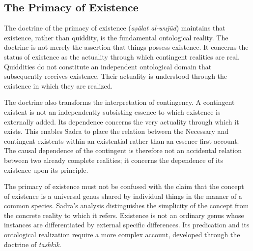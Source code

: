


\subsection{The Primacy of Existence}
\label{subsec:ch08_s17_ss05}

\label{para:VS.B01.P01.C08.S17.SS05.P001}

The doctrine of the primacy of existence
(\textit{aṣālat al-wujūd}) maintains that
existence, rather than quiddity, is
the fundamental ontological reality.
The doctrine is not merely the assertion
that things possess existence. It
concerns the status of existence
as the actuality through which
contingent realities are real.
Quiddities do not constitute an
independent ontological domain
that subsequently receives existence.
Their actuality is understood
through the existence in which
they are realized.

\label{para:VS.B01.P01.C08.S17.SS05.P002}

The doctrine also transforms the
interpretation of contingency.
A contingent existent is not
an independently subsisting essence
to which existence is externally
added. Its dependence concerns
the very actuality through which
it exists. This enables Sadra to
place the relation between the
Necessary and contingent existents
within an existential rather than
an essence-first account. The
causal dependence of the contingent
is therefore not an accidental
relation between two already
complete realities; it concerns
the dependence of its existence
upon its principle.

\label{para:VS.B01.P01.C08.S17.SS05.P003}

The primacy of existence must
not be confused with the claim
that the concept of existence
is a universal genus shared
by individual things in the
manner of a common species.
Sadra's analysis distinguishes
the simplicity of the concept
from the concrete reality to
which it refers. Existence is
not an ordinary genus whose
instances are differentiated
by external specific differences.
Its predication and its
ontological realization require
a more complex account, developed
through the doctrine of
\textit{tashkīk}.

